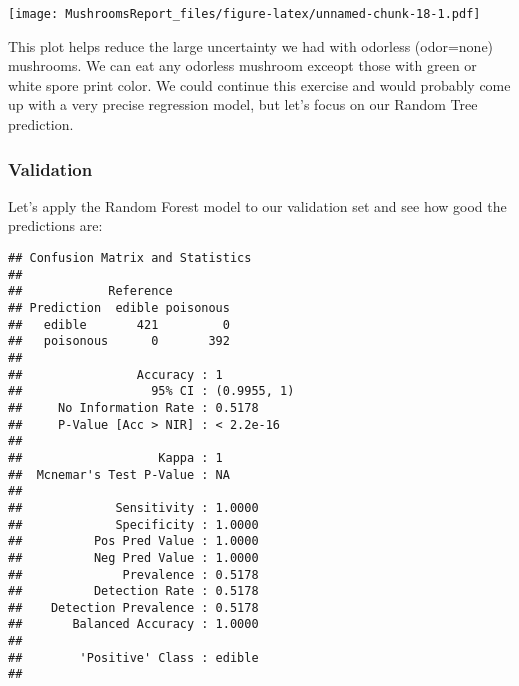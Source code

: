 \documentclass[]{article}
\newenvironment{Shaded}{\begin{snugshade}}{\end{snugshade}}
\newcommand{\KeywordTok}[1]{\textcolor[rgb]{0.13,0.29,0.53}{\textbf{#1}}}
\newcommand{\DataTypeTok}[1]{\textcolor[rgb]{0.13,0.29,0.53}{#1}}
\newcommand{\StringTok}[1]{\textcolor[rgb]{0.31,0.60,0.02}{#1}}
\newcommand{\OperatorTok}[1]{\textcolor[rgb]{0.81,0.36,0.00}{\textbf{#1}}}
\newcommand{\NormalTok}[1]{#1}
\begin{document}
\texttt{[image: MushroomsReport\_files/figure-latex/unnamed-chunk-18-1.pdf]}

This plot helps reduce the large uncertainty we had with odorless
(odor=none) mushrooms. We can eat any odorless mushroom exceopt those
with green or white spore print color. We could continue this exercise
and would probably come up with a very precise regression model, but
let's focus on our Random Tree prediction.

\subsubsection{Validation}\label{validation}

Let's apply the Random Forest model to our validation set and see how
good the predictions are:

\begin{Shaded}
\end{Shaded}

\begin{verbatim}
## Confusion Matrix and Statistics
## 
##            Reference
## Prediction  edible poisonous
##   edible       421         0
##   poisonous      0       392
##                                      
##                Accuracy : 1          
##                  95% CI : (0.9955, 1)
##     No Information Rate : 0.5178     
##     P-Value [Acc > NIR] : < 2.2e-16  
##                                      
##                   Kappa : 1          
##  Mcnemar's Test P-Value : NA         
##                                      
##             Sensitivity : 1.0000     
##             Specificity : 1.0000     
##          Pos Pred Value : 1.0000     
##          Neg Pred Value : 1.0000     
##              Prevalence : 0.5178     
##          Detection Rate : 0.5178     
##    Detection Prevalence : 0.5178     
##       Balanced Accuracy : 1.0000     
##                                      
##        'Positive' Class : edible     
## 
\end{verbatim}
\end{document}
